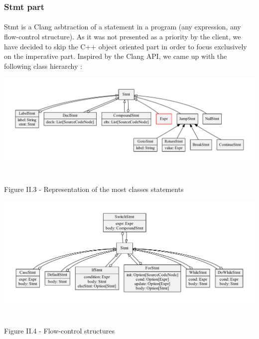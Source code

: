 \documentclass{report}
\begin{document}
\subsubsection{Stmt part}

\paragraph{}
\hspace{4mm}Stmt is a Clang asbtraction of a statement in a program (any expression, any flow-control structure). As it was not presented as a priority by the client, we have decided to skip the C++ object oriented 
part in order to focus exclusively on the imperative part. Inspired by the Clang API, we came up
 with the following class hierarchy :

\begin{center}
\includegraphics[scale=0.5]{data/basic_Stmt_classes}
~\\~\\Figure II.3 - Representation of the most classes statements
\end{center}

\begin{center}
\includegraphics[scale=0.5]{data/flow_control_Stmt_classes}
~\\~\\Figure II.4 - Flow-control structures
\end{center}
\end{document}
